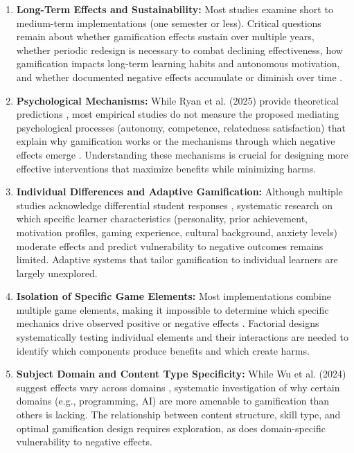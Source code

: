 \documentclass[12pt,a4paper]{article}
\begin{document}
\begin{enumerate}
    \item \textbf{Long-Term Effects and Sustainability:} Most studies examine short to medium-term implementations (one semester or less). Critical questions remain about whether gamification effects sustain over multiple years, whether periodic redesign is necessary to combat declining effectiveness, how gamification impacts long-term learning habits and autonomous motivation, and whether documented negative effects accumulate or diminish over time \parencite{wu2024,rodriguez2025,toda2022,sevilla2024,surendeleg2024}.
    
    \item \textbf{Psychological Mechanisms:} While Ryan et al. (2025) provide theoretical predictions \parencite{ryan2025}, most empirical studies do not measure the proposed mediating psychological processes (autonomy, competence, relatedness satisfaction) that explain why gamification works or the mechanisms through which negative effects emerge \parencite{wu2024,dahri2024,surendeleg2024}. Understanding these mechanisms is crucial for designing more effective interventions that maximize benefits while minimizing harms.
    
    \item \textbf{Individual Differences and Adaptive Gamification:} Although multiple studies acknowledge differential student responses \parencite{ryan2025,wu2024,rodriguez2025,ojonuba2023,surendeleg2024}, systematic research on which specific learner characteristics (personality, prior achievement, motivation profiles, gaming experience, cultural background, anxiety levels) moderate effects and predict vulnerability to negative outcomes remains limited. Adaptive systems that tailor gamification to individual learners are largely unexplored.
    
    \item \textbf{Isolation of Specific Game Elements:} Most implementations combine multiple game elements, making it impossible to determine which specific mechanics drive observed positive or negative effects \parencite{ojonuba2023,wang2023,surendeleg2024}. Factorial designs systematically testing individual elements and their interactions are needed to identify which components produce benefits and which create harms.
    
    \item \textbf{Subject Domain and Content Type Specificity:} While Wu et al. (2024) suggest effects vary across domains \parencite{wu2024}, systematic investigation of why certain domains (e.g., programming, AI) are more amenable to gamification than others is lacking. The relationship between content structure, skill type, and optimal gamification design requires exploration, as does domain-specific vulnerability to negative effects.
    

\end{enumerate}
\end{document}
